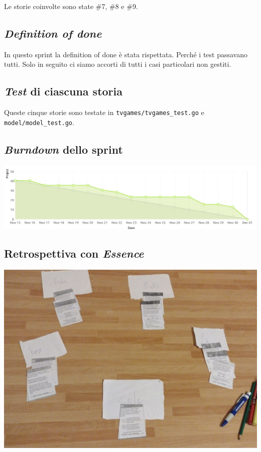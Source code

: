 \documentclass{article}
\begin{document}
Le storie coinvolte sono state \#7, \#8 e \#9.

\subsection{\emph{Definition of done}}

In questo sprint la definition of done è stata rispettata. Perché i test
passavano tutti. Solo in seguito ci siamo accorti di tutti i casi particolari
non gestiti.

\subsection{\emph{Test} di ciascuna storia}

Queste cinque storie sono testate in \verb!tvgames/tvgames_test.go! e
\verb!model/model_test.go!.

\subsection{\emph{Burndown} dello sprint}

\includegraphics[width=\textwidth]{burndown-3}

\subsection{Retrospettiva con \emph{Essence}}

\includegraphics[width=\textwidth]{essence-3}
\end{document}
